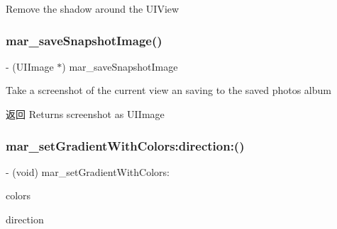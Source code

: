 Remove the shadow around the U\+I\+View \mbox{\label{category_u_i_view_07_m_a_r_e_x_08_a3cb40e1f4b4fba0a9bec07143e2f29fb}} 
\subsubsection{\texorpdfstring{mar\+\_\+save\+Snapshot\+Image()}{mar\_saveSnapshotImage()}}
{\footnotesize\ttfamily -\/ (U\+I\+Image $\ast$) mar\+\_\+save\+Snapshot\+Image \begin{DoxyParamCaption}{ }\end{DoxyParamCaption}}

Take a screenshot of the current view an saving to the saved photos album

\begin{DoxyReturn}{返回}
Returns screenshot as U\+I\+Image 
\end{DoxyReturn}
\mbox{\label{category_u_i_view_07_m_a_r_e_x_08_ac74a7e8414b92d4bf8a8f7489f77b162}} 
\subsubsection{\texorpdfstring{mar\+\_\+set\+Gradient\+With\+Colors\+:direction\+:()}{mar\_setGradientWithColors:direction:()}\hspace{0.1cm}{\footnotesize\ttfamily [1/2]}}
{\footnotesize\ttfamily -\/ (void) mar\+\_\+set\+Gradient\+With\+Colors\+: \begin{DoxyParamCaption}\item[{(N\+S\+Array $\ast$)}]{colors }\item[{direction:(M\+A\+R\+U\+I\+View\+Linear\+Gradient\+Direction)}]{direction }\end{DoxyParamCaption}\hspace{0.3cm}{\ttfamily [implementation]}}

